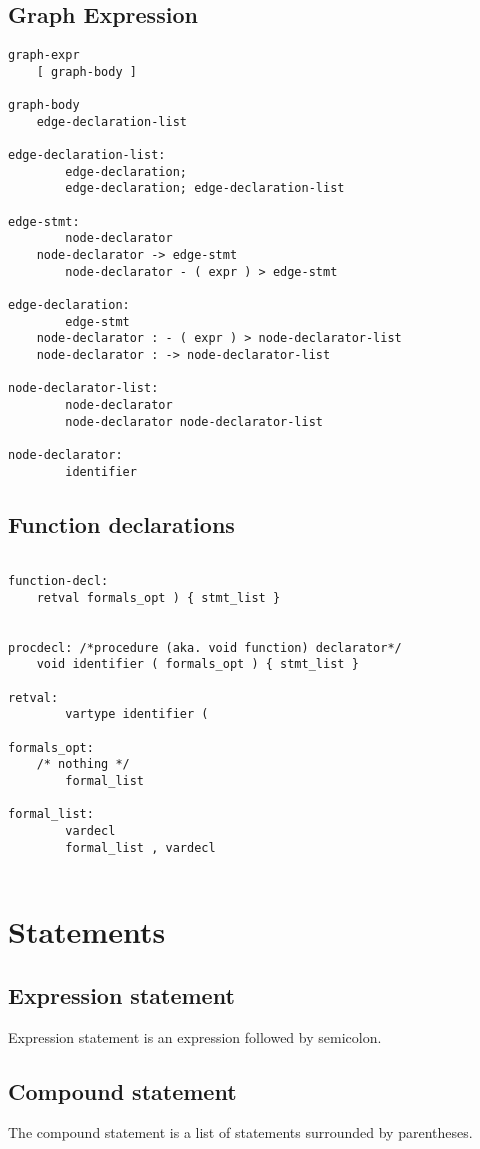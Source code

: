 \documentclass[a4paper,12pt]{article}
\begin{document}
\subsection{Graph Expression}
\begin{lstlisting}
graph-expr
	[ graph-body ]
		
graph-body
	edge-declaration-list

edge-declaration-list:
     	edge-declaration;
    	edge-declaration; edge-declaration-list 
 
edge-stmt:
     	node-declarator 
   	node-declarator -> edge-stmt 
    	node-declarator - ( expr ) > edge-stmt 
 
edge-declaration:
     	edge-stmt 
   	node-declarator : - ( expr ) > node-declarator-list  
   	node-declarator : -> node-declarator-list  
 
node-declarator-list:
     	node-declarator 
     	node-declarator node-declarator-list    
 
node-declarator:
     	identifier

\end{lstlisting}

\subsection{Function declarations}
\begin{lstlisting}

function-decl:
 	retval formals_opt ) { stmt_list }

  
procdecl: /*procedure (aka. void function) declarator*/
   	void identifier ( formals_opt ) { stmt_list }
  
retval:
      	vartype identifier (
 
formals_opt:
	/* nothing */ 
    	formal_list 
  
formal_list:
      	vardecl
    	formal_list , vardecl 
 
\end{lstlisting}		

\section{Statements}
\subsection{Expression statement}
Expression statement is an expression followed by semicolon.
\subsection{Compound statement}
The compound statement is a list of statements surrounded by parentheses.
\end{document}
